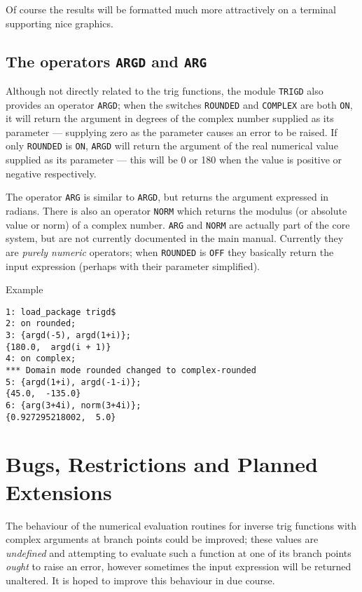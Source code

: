 Of course the results will be formatted much more attractively on a terminal supporting nice graphics.

\subsection{The operators \texttt{ARGD} and \texttt{ARG}}
Although not directly related to the trig functions, the module \texttt{TRIGD} also provides an operator \texttt{ARGD}; when the switches \texttt{ROUNDED} and \texttt{COMPLEX} are both \texttt{ON}, it will return the argument in degrees of the complex number supplied as its parameter  --- supplying zero as the parameter causes an error to be raised.
 If only \texttt{ROUNDED} is \texttt{ON},  
\texttt{ARGD} will return the argument of the real numerical value supplied as its parameter --- this will be  0 or 180 when the value is positive or negative respectively.

The operator \texttt{ARG} is similar to \texttt{ARGD}, but returns the argument expressed in  radians.  There is also an operator \texttt{NORM} which returns the modulus (or absolute value or norm) of a complex number.  \texttt{ARG} and \texttt{NORM} are actually part of the {\REDUCE} core system, but are not currently documented in the main manual.  Currently they are \emph{purely numeric} operators; when \texttt{ROUNDED} is \texttt{OFF} they basically return the input expression (perhaps with their parameter simplified).

Example
\begin{verbatim}
1: load_package trigd$
2: on rounded;
3: {argd(-5), argd(1+i)};
{180.0,  argd(i + 1)}
4: on complex;
*** Domain mode rounded changed to complex-rounded 
5: {argd(1+i), argd(-1-i)}; 
{45.0,  -135.0} 
6: {arg(3+4i), norm(3+4i)};
{0.927295218002,  5.0}
\end{verbatim}
 
\section{Bugs, Restrictions and Planned Extensions}
The behaviour of the numerical evaluation routines for inverse trig functions with complex arguments at branch points could be improved; these values are \emph{undefined} and attempting to evaluate such a function at one of its branch points \emph{ought} to raise an error, however sometimes the input expression will be returned unaltered.  It is hoped to improve this behaviour in due course.

